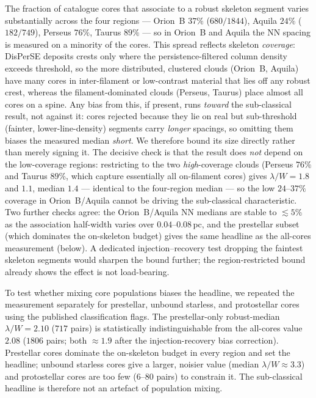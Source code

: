\documentclass[usenatbib,twoside,twocolumn]{mnras}
\begin{document}
The fraction of catalogue cores that associate to a robust skeleton segment varies substantially across the four regions --- Orion~B $37\%$ ($680/1844$), Aquila $24\%$ ($182/749$), Perseus $76\%$, Taurus $89\%$ --- so in Orion~B and Aquila the NN spacing is measured on a minority of the cores. This spread reflects skeleton \emph{coverage}: DisPerSE deposits crests only where the persistence-filtered column density exceeds threshold, so the more distributed, clustered clouds (Orion~B, Aquila) have many cores in inter-filament or low-contrast material that lies off any robust crest, whereas the filament-dominated clouds (Perseus, Taurus) place almost all cores on a spine. Any bias from this, if present, runs \emph{toward} the sub-classical result, not against it: cores rejected because they lie on real but sub-threshold (fainter, lower-line-density) segments carry \emph{longer} spacings, so omitting them biases the measured median \emph{short}. We therefore bound its size directly rather than merely signing it. The decisive check is that the result does \emph{not} depend on the low-coverage regions: restricting to the two \emph{high}-coverage clouds (Perseus $76\%$ and Taurus $89\%$, which capture essentially all on-filament cores) gives $\lambda/W=1.8$ and $1.1$, median $1.4$ --- identical to the four-region median --- so the low $24$--$37\%$ coverage in Orion~B/Aquila cannot be driving the sub-classical characteristic. Two further checks agree: the Orion~B/Aquila NN medians are stable to $\lesssim5\%$ as the association half-width varies over $0.04$--$0.08$\,pc, and the prestellar subset (which dominates the on-skeleton budget) gives the same headline as the all-cores measurement (below). A dedicated injection--recovery test dropping the faintest skeleton segments would sharpen the bound further; the region-restricted bound already shows the effect is not load-bearing.

To test whether mixing core populations biases the headline, we repeated the measurement separately for prestellar, unbound starless, and protostellar cores using the published classification flags. The prestellar-only robust-median $\lambda/W=2.10$ ($717$ pairs) is statistically indistinguishable from the all-cores value $2.08$ ($1806$ pairs; both $\approx1.9$ after the injection-recovery bias correction). Prestellar cores dominate the on-skeleton budget in every region and set the headline; unbound starless cores give a larger, noisier value (median $\lambda/W\approx3.3$) and protostellar cores are too few ($6$--$80$ pairs) to constrain it. The sub-classical headline is therefore not an artefact of population mixing.
\end{document}
